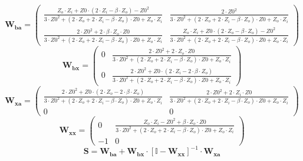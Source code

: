 \[ \mathbf{W_{ba}} = \left(\begin{smallmatrix} \frac{Z_o\cdot
Z_i+Z0\cdot \left(2\cdot Z_i-\beta\cdot Z_o\right)-Z0^2}{3\cdot
Z0^2+\left(2\cdot Z_o+2\cdot Z_i-\beta\cdot Z_o\right)\cdot
Z0+Z_o\cdot Z_i} & \frac{2\cdot Z0^2}{3\cdot Z0^2+\left(2\cdot
Z_o+2\cdot Z_i-\beta\cdot Z_o\right)\cdot Z0+Z_o\cdot Z_i} \\
\frac{2\cdot Z0^2+2\cdot \beta\cdot Z_o\cdot Z0}{3\cdot
Z0^2+\left(2\cdot Z_o+2\cdot Z_i-\beta\cdot Z_o\right)\cdot
Z0+Z_o\cdot Z_i} & \frac{Z_o\cdot Z_i+Z0\cdot \left(2\cdot
Z_o-\beta\cdot Z_o\right)-Z0^2}{3\cdot Z0^2+\left(2\cdot Z_o+2\cdot
Z_i-\beta\cdot Z_o\right)\cdot Z0+Z_o\cdot Z_i}
\end{smallmatrix}\right) \]
\[ \mathbf{W_{bx}} = \left(\begin{smallmatrix} 0 & \frac{2\cdot
Z0^2+2\cdot Z_o\cdot Z0}{3\cdot Z0^2+\left(2\cdot Z_o+2\cdot
Z_i-\beta\cdot Z_o\right)\cdot Z0+Z_o\cdot Z_i} \\ 0 & \frac{2\cdot
Z0^2+Z0\cdot \left(2\cdot Z_i-2\cdot \beta\cdot Z_o\right)}{3\cdot
Z0^2+\left(2\cdot Z_o+2\cdot Z_i-\beta\cdot Z_o\right)\cdot
Z0+Z_o\cdot Z_i} \end{smallmatrix}\right) \]
\[ \mathbf{W_{xa}} = \left(\begin{smallmatrix} \frac{2\cdot
Z0^2+Z0\cdot \left(2\cdot Z_o-2\cdot \beta\cdot Z_o\right)}{3\cdot
Z0^2+\left(2\cdot Z_o+2\cdot Z_i-\beta\cdot Z_o\right)\cdot
Z0+Z_o\cdot Z_i} & \frac{2\cdot Z0^2+2\cdot Z_i\cdot Z0}{3\cdot
Z0^2+\left(2\cdot Z_o+2\cdot Z_i-\beta\cdot Z_o\right)\cdot
Z0+Z_o\cdot Z_i} \\ 0 & 0 \end{smallmatrix}\right) \]
\[ \mathbf{W_{xx}} = \left(\begin{smallmatrix} 0 & \frac{Z_o\cdot
Z_i-Z0^2+\beta\cdot Z_o\cdot Z0}{3\cdot Z0^2+\left(2\cdot Z_o+2\cdot
Z_i-\beta\cdot Z_o\right)\cdot Z0+Z_o\cdot Z_i} \\ -1 & 0
\end{smallmatrix}\right) \]
\[ \mathbf{S}=\mathbf{W_{ba}}+\mathbf{W_{bx}}\cdot\left[ \mathbb{I}
-\mathbf{W_{xx}}\right]^{-1}\cdot\mathbf{W_{xa}} \]
